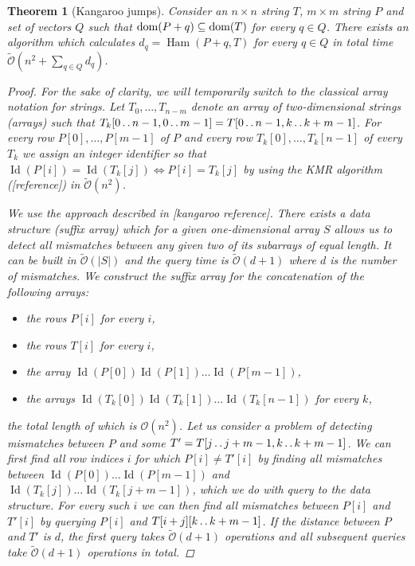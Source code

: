 \documentclass[11pt]{article}
\def\dd{\mathinner{.\,.}}
\renewcommand{\O}{\mathcal{O}}
\newcommand{\tO}{\tilde{\mathcal{O}}}
\theoremstyle{plain}
\newtheorem{theorem}{Theorem}
\theoremstyle{definition}
\theoremstyle{remark}
\DeclareMathOperator*{\Ham}{Ham}
\DeclareMathOperator*{\ID}{Id}
\begin{document}
\begin{theorem}[Kangaroo jumps]\label{kangaroos}
	Consider an $n \times n$ string $T$, $m \times m$ string $P$ and set of vectors $Q$ such that $\operatorname*{dom}(P + q) \subseteq \operatorname*{dom}(T)$ for every $q \in Q$.
	There exists an algorithm which calculates $ d_q = \Ham(P + q, T) $ for every $q \in Q$ in total time $\tO(n^2 + \sum_{q \in Q} d_q)$.
	\begin{proof}
		For the sake of clarity, we will temporarily switch to the classical array notation for strings.
		Let $T_0, \dots, T_{n - m}$ denote an array of two-dimensional strings (arrays) such that $T_k[0 \dd n - 1, 0 \dd m - 1] = T[0 \dd n - 1, k \dd k + m - 1]$.
		For every row $P[0], \dots, P[m - 1]$ of $P$ and every row $T_k[0], \dots, T_k[n - 1]$ of every $T_k$ we assign an integer identifier so that $\ID(P[i]) = \ID(T_k[j]) \Leftrightarrow P[i] = T_k[j]$ by using the KMR algorithm ([reference]) in $\tO(n^2)$.
		
		We use the approach described in [kangaroo reference].
		There exists a data structure (suffix array) which for a given one-dimensional array $S$ allows us to detect all mismatches between any given two of its subarrays of equal length.
		It can be built in $\tO(|S|)$ and the query time is $\tO(d + 1)$ where $d$ is the number of mismatches.
		We construct the suffix array for the concatenation of the following arrays:
		\begin{itemize}
			\item the rows $P[i]$ for every $i$,
			\item the rows $T[i]$ for every $i$,
			\item the array $\ID(P[0]) \ID(P[1]) \dots \ID(P[m - 1])$,
			\item the arrays $\ID(T_k[0]) \ID(T_k[1]) \dots \ID(T_k[n - 1])$ for every $k$,
		\end{itemize}
		the total length of which is $\O(n^2)$.
		Let us consider a problem of detecting mismatches between $P$ and some $T' = T[j \dd j + m - 1, k \dd k + m - 1]$.
		We can first find all row indices $i$ for which $P[i] \neq T'[i]$ by finding all mismatches between $\ID(P[0]) \dots \ID(P[m - 1])$ and $\ID(T_k[j]) \dots \ID(T_k[j + m - 1])$, which we do with query to the data structure.
		For every such $i$ we can then find all mismatches between $P[i]$ and $T'[i]$ by querying $P[i]$ and $T[i + j][k \dd k + m - 1]$.
		If the distance between $P$ and $T'$ is $d$, the first query takes $\tO(d + 1)$ operations and all subsequent queries take $\tO(d + 1)$ operations in total.
	\end{proof}
\end{theorem}
\end{document}
